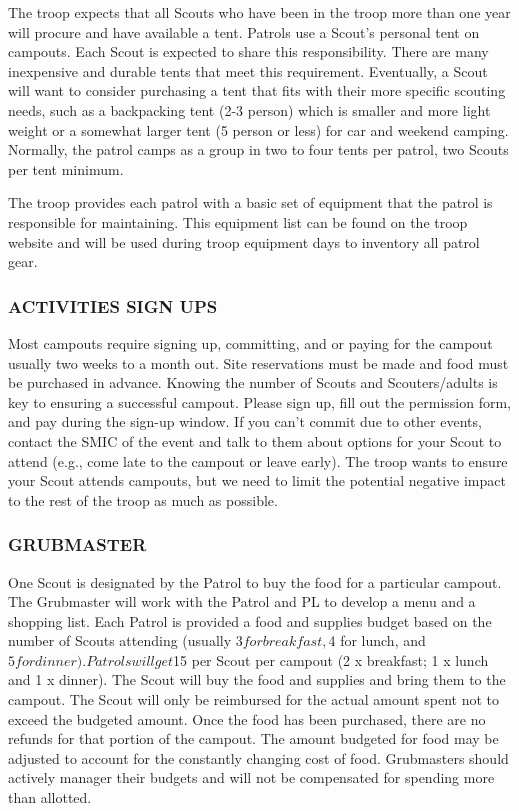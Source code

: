 \documentclass{ltxguide}
\begin{document}
The troop expects that all Scouts who have been in the troop more than one year will procure and have available a tent. Patrols use a Scout's personal tent on campouts. Each Scout is expected to share this responsibility. There are many inexpensive and durable tents that meet this requirement. Eventually, a Scout will want to consider purchasing a tent that fits with their more specific scouting needs, such as a backpacking tent (2-3 person) which is smaller and more light weight or a somewhat larger tent (5 person or less) for car and weekend camping. Normally, the patrol camps as a group in two to four tents per patrol, two Scouts per tent minimum. 

The troop provides each patrol with a basic set of equipment that the patrol is responsible for maintaining. This equipment list can be found on the troop website and will be used during troop equipment days to inventory all patrol gear.

\subsubsection{ACTIVITIES SIGN UPS}
Most campouts require signing up, committing, and or paying for the campout usually two weeks to a month out. Site reservations must be made and food must be purchased in advance. Knowing the number of Scouts and Scouters/adults is key to ensuring a successful campout. Please sign up, fill out the permission form, and pay during the sign-up window. If you can't commit due to other events, contact the SMIC of the event and talk to them about options for your Scout to attend (e.g., come late to the campout or leave early). The troop wants to ensure your Scout attends campouts, but we need to limit the potential negative impact to the rest of the troop as much as possible.

\subsubsection{GRUBMASTER}
One Scout is designated by the Patrol to buy the food for a particular campout. The Grubmaster will work with the Patrol and \ac{PL} to develop a menu and a shopping list. Each Patrol is provided a food and supplies budget based on the number of Scouts attending (usually $3 for breakfast, $4 for lunch, and $5 for dinner). Patrols will get $15 per Scout per campout (2 x breakfast; 1 x lunch and 1 x dinner). The Scout will buy the food and supplies and bring them to the campout. The Scout will only be reimbursed for the actual amount spent  not to exceed the budgeted amount. Once the food has been purchased, there are no refunds  for that portion of the campout. The amount budgeted for food may be adjusted to account for the constantly changing cost of food. Grubmasters should actively manager their budgets and will not be compensated for spending more than allotted.
\end{document}

